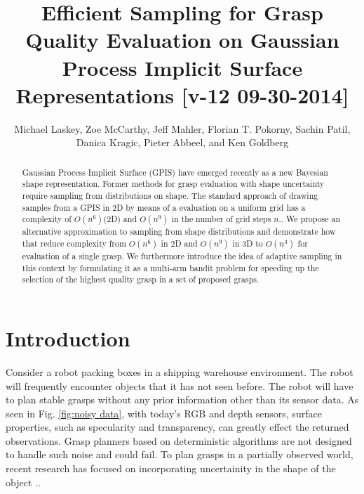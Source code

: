 \documentclass[letterpaper, 10 pt, conference]{ieeeconf}  %
\title{\LARGE \bf
Efficient Sampling for Grasp Quality Evaluation on Gaussian Process Implicit Surface Representations [v-12 09-30-2014]}
\author{Michael Laskey, Zoe McCarthy, Jeff Mahler, Florian T. Pokorny, Sachin Patil,\\  Danica Kragic, Pieter Abbeel, and Ken Goldberg}%
\begin{document}
\maketitle
\thispagestyle{empty}
\pagestyle{empty}




\begin{abstract}
Gaussian Process Implicit Surface (GPIS) have emerged recently as a new Bayesian shape representation.  Former methods for grasp evaluation with shape uncertainty require sampling from  distributions on shape. The standard approach of drawing samples from a GPIS in 2D by means of a evaluation on a uniform grid has a complexity of $O(n^6)$(2D) and $O(n^9)$ in the number of grid steps $n$.. We propose an alternative approximation to sampling from shape distributions and demonstrate how that reduce complexity from $O(n^6)$ in 2D and $O(n^9)$ in 3D to $O(n^3)$ for evaluation of a single grasp. We furthermore introduce the idea of adaptive sampling in this context by formulating it as a multi-arm bandit problem for speeding up the selection of the highest quality grasp in a set of proposed grasps. 
\end{abstract}
\section{Introduction}

\vspace{10pt}

Consider a robot packing boxes in a shipping warehouse environment. The robot will frequently encounter objects that it has not seen before. The robot will have to plan stable grasps without any prior information other than its sensor data. As seen in Fig. \ref{fig:noisy data}, with today's RGB and depth sensors, surface properties, such as specularity and transparency, can greatly effect the returned observations. Grasp planners based on deterministic algorithms are not designed to handle such noise and could fail. To plan grasps in a partially observed world, recent research has focused on incorporating uncertainity in the shape of the object \cite{kehoe2012estimating} \cite{kehoe2012estimating} \cite{christopoulos2007handling} \cite{zheng2005}..
\end{document}
